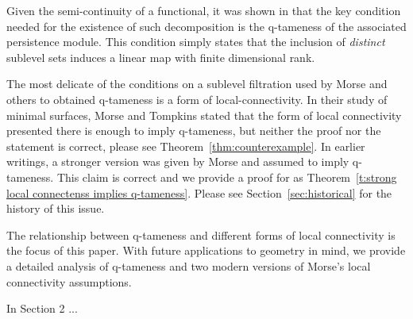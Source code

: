 Given the semi-continuity of a functional, it was shown in \cite{schmahl2020structure} that the key condition needed for the existence of such decomposition is the q-tameness of the associated persistence module.
This condition simply states that the inclusion of \textit{distinct} sublevel sets induces a linear map with finite dimensional rank.

The most delicate of the conditions on a sublevel filtration used by Morse and others to obtained q-tameness is a form of local-connectivity.
In their study of minimal surfaces, Morse and Tompkins stated that the form of local connectivity presented there is enough to imply q-tameness, but neither the proof nor the statement is correct, please see Theorem~\ref{thm:counterexample}.
In earlier writings, a stronger version was given by Morse and assumed to imply q-tameness. This claim is correct and we provide a proof for as Theorem~\ref{t:strong local connectenss implies q-tameness}.
Please see Section~\ref{sec:historical} for the history of this issue.

The relationship between q-tameness and different forms of local connectivity is the focus of this paper.
With future applications to geometry in mind, we provide a detailed analysis of q-tameness and two modern versions of Morse's local connectivity assumptions.

In Section 2 ...






